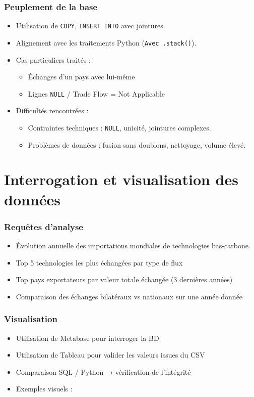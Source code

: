 \documentclass[11pt]{beamer}
\begin{document}
\begin{frame}
  \frametitle{Peuplement de la base}
  \begin{itemize}
    \item<1-> Utilisation de \texttt{COPY}, \texttt{INSERT INTO} avec jointures.
    \item<1-> Alignement avec les traitements Python (\texttt{Avec .stack()}).
    \item<1-> Cas particuliers traités : 
      \begin{itemize}
        \item Échanges d’un pays avec lui-même
        \item Lignes \texttt{NULL} / Trade Flow = Not Applicable
      \end{itemize}
    \item<2-> Difficultés rencontrées :
    	\begin{itemize}
  			\item Contraintes techniques : \texttt{NULL}, unicité, jointures complexes.
  			\item Problèmes de données : fusion sans doublons, nettoyage, volume élevé.
		\end{itemize}
    \end{itemize}
\end{frame}

\section{Interrogation et visualisation des données}
\begin{frame}
  \frametitle{Requêtes d’analyse}
  \begin{itemize}
    \item Évolution annuelle des importations mondiales de technologies bas-carbone.
    \item Top 5 technologies les plus échangées par type de flux
    \item Top pays exportateurs par valeur totale échangée (3 dernières années)
    \item Comparaison des échanges bilatéraux vs nationaux sur une année donnée
  \end{itemize}
\end{frame}

\begin{frame}
  \frametitle{Visualisation}
  \begin{itemize}
    \item Utilisation de Metabase pour interroger la BD
    \item Utilisation de Tableau pour valider les valeurs issues du CSV
    \item Comparaison SQL / Python → vérification de l’intégrité
    \item Exemples visuels :
  \end{itemize}
\end{frame}
\end{document}
